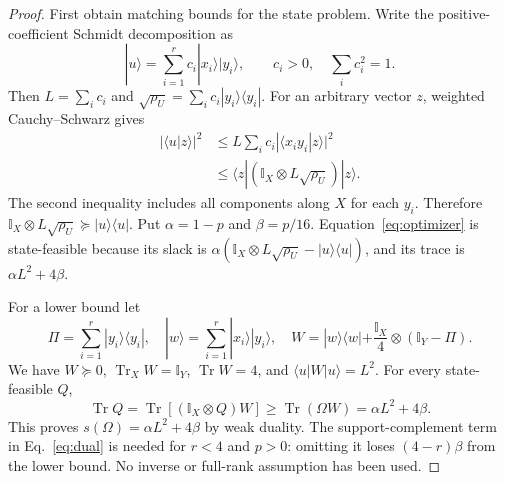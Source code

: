 \documentclass[11pt]{article}
\newcommand{\Tr}{\operatorname{Tr}}
\newcommand{\I}{\mathbb{I}}
\newcommand{\ket}[1]{|#1\rangle}
\newcommand{\bra}[1]{\langle#1|}
\begin{document}
\begin{proof}
First obtain matching bounds for the state problem. Write the
positive-coefficient Schmidt decomposition as
\[
 \ket u=\sum_{i=1}^r c_i\ket{x_i}\ket{y_i},
 \qquad c_i>0,\quad \sum_i c_i^2=1.
\]
Then $L=\sum_i c_i$ and
$\sqrt{\rho_U}=\sum_i c_i\ket{y_i}\bra{y_i}$.
For an arbitrary vector $z$, weighted Cauchy--Schwarz gives
\begin{align}
 |\bra u z\rangle|^2
 &\leq L\sum_i c_i|\bra{x_i y_i}z\rangle|^2\\
 &\leq \bra z(\I_X\otimes L\sqrt{\rho_U})\ket z.
\end{align}
The second inequality includes all components along $X$ for each
$y_i$. Therefore
$\I_X\otimes L\sqrt{\rho_U}\succeq\ket u\bra u$.
Put $\alpha=1-p$ and $\beta=p/16$.
Equation~\eqref{eq:optimizer} is state-feasible because its slack is
$\alpha(\I_X\otimes L\sqrt{\rho_U}-\ket u\bra u)$,
and its trace is $\alpha L^2+4\beta$.

For a lower bound let
\begin{equation}
 \Pi=\sum_{i=1}^r\ket{y_i}\bra{y_i},\quad
 \ket w=\sum_{i=1}^r\ket{x_i}\ket{y_i},\quad
 W=\ket w\bra w+\frac{\I_X}{4}\otimes(\I_Y-\Pi).
 \label{eq:dual}
\end{equation}
We have $W\succeq0$, $\Tr_X W=\I_Y$, $\Tr W=4$, and
$\bra u W\ket u=L^2$. For every state-feasible $Q$,
\begin{equation}
 \Tr Q=\Tr[(\I_X\otimes Q)W]
       \geq\Tr(\Omega W)=\alpha L^2+4\beta.
\end{equation}
This proves $s(\Omega)=\alpha L^2+4\beta$ by weak duality.
The support-complement term in Eq.~\eqref{eq:dual} is needed for
$r<4$ and $p>0$: omitting it loses $(4-r)\beta$ from the lower bound.
No inverse or full-rank assumption has been used.


\end{proof}
\end{document}
